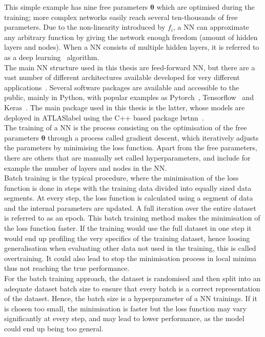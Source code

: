 This simple example has nine free parameters $\boldsymbol{\theta}$ which are optimised during the training; more complex networks easily reach several ten-thousands of free parameters. Due to the non-linearity introduced by $f_i$, a NN can approximate any arbitrary function by giving the network enough freedom (amount of hidden layers and nodes). When a NN consists of multiple hidden layers, it is referred to as a deep learning~\cite{Goodfellow-et-al-2016} algorithm.\\

The main NN structure used in this thesis are feed-forward NN, but there are a vast number of different architectures available developed for very different applications~\cite{livingreview}. Several software packages are available and accessible to the public,  mainly in Python, with popular examples as Pytorch~\cite{NEURIPS2019_9015}, Tensorflow~\cite{tensorflow2015-whitepaper} and Keras~\cite{chollet2015keras}. The main package used in this thesis is the latter, whose models are deployed in \acrshort{ATLASlabel} using the C++ based package lwtnn~\cite{lwtnn}.\\

The training of a NN is the process consisting on the optimisation of the free parameters $\boldsymbol{\theta}$ through a process called gradient descent, which iteratively adjusts the parameters by minimising the loss function. Apart from the free parameters, there are others that are manually set called hyperparameters, and include for example the number of layers and nodes in the NN.\\

Batch training is the typical procedure, where the minimisation of the loss function is done in steps with the training data divided into equally sized data segments. At every step, the loss function is calculated using a segment of data and the internal parameters are updated. A full iteration over the entire dataset is referred to as an epoch. This batch training method makes the minimisation of the loss function faster. If the training would use the full dataset in one step it would end up profiling the very specifics of the training dataset, hence loosing generalisation when evaluating other data not used in the training, this is called overtraining. It could also lead to stop the minimisation process in local minima thus not reaching the true performance.\\

For the batch training approach, the dataset is randomised and then split into an adequate dataset batch size to ensure that every batch is a correct representation of the dataset. Hence, the batch size is a hyperparameter of a NN trainings. If it is chosen too small, the minimisation is faster but the loss function may vary significantly at every step, and may lead to lower performance, as the model could end up being too general.

